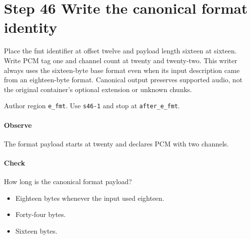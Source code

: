 \section{Step 46 Write the canonical format identity}\label{pcm-wav-s46}
Place the fmt identifier at offset twelve and payload length sixteen at sixteen. Write PCM tag one and channel count at twenty and twenty-two. This writer always uses the sixteen-byte base format even when its input description came from an eighteen-byte format. Canonical output preserves supported audio, not the original container's optional extension or unknown chunks.

Author region \texttt{e\_fmt}. Use \texttt{s46-1} and stop at \texttt{after\_e\_fmt}.

\paragraph{Observe} The format payload starts at twenty and declares PCM with two channels.

\paragraph{Check} How long is the canonical format payload?
\begin{itemize}
\item[A.] Eighteen bytes whenever the input used eighteen.
\item[B.] Forty-four bytes.
\item[C.] Sixteen bytes.
\end{itemize}
